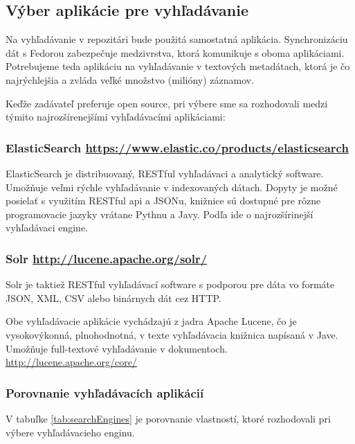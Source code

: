 \documentclass[thesis=M,slovak]{FITthesis}[2013/05/06]
\begin{document}
\subsection{Výber aplikácie pre vyhľadávanie}
Na vyhľadávanie v repozitári bude použitá samostatná aplikácia. Synchronizáciu dát s Fedorou zabezpečuje medzivrstva, ktorá komunikuje s oboma aplikáciami. Potrebujeme teda aplikáciu na vyhľadávanie v textových metadátach, ktorá je čo najrýchlejšia a zvláda veľké množstvo (milióny) záznamov.

Keďže zadávateľ preferuje open source, pri výbere sme sa rozhodovali medzi týmito najrozšírenejšími vyhľadávacími aplikáciami:
\subsubsection{ElasticSearch \url{https://www.elastic.co/products/elasticsearch}}

ElasticSearch je distribuovaný, RESTful vyhľadávaci a analytický software. Umožňuje veľmi rýchle vyhľadávanie v indexovaných dátach. Dopyty je možné posielať s využitím RESTful api a JSONu, knižnice sú dostupné pre rôzne programovacie jazyky vrátane Pythnu a Javy. Podľa \cite{NajpouzivanejsieVyhladavace} ide o najrozšírinejší vyhľadávaci engine.

\subsubsection{Solr \url{http://lucene.apache.org/solr/}}

Solr je taktiež RESTful vyhľadávací software s podporou pre dáta vo formáte JSON, XML, CSV alebo binárnych dát cez HTTP.

Obe vyhľadávacie aplikácie vychádzajú z jadra Apache Lucene, čo je vysokovýkonná, plnohodnotná, v texte vyhľadávacia knižnica napísaná v Jave. Umožňuje full-textové vyhľadávanie v dokumentoch. \url{http://lucene.apache.org/core/}

\subsubsection{Porovnanie vyhľadávacích aplikácií}
V tabuľke \ref{tab:searchEngines} je porovnanie vlastností, ktoré rozhodovali pri výbere vyhľadávacieho enginu.
\end{document}
